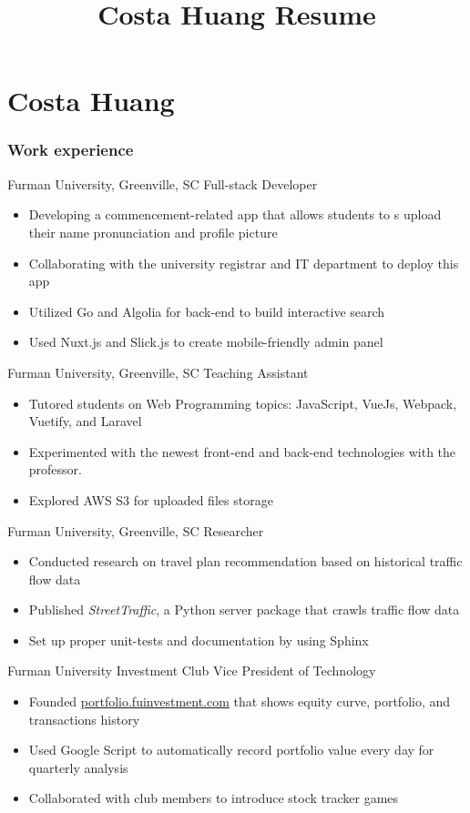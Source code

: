 \documentclass{tccv}
\title{Costa Huang Resume}
\begin{document}
\part{Costa Huang}

\section{Work experience}

\begin{eventlist}

     {Furman University, Greenville, SC}
     {Full-stack Developer}
\begin{itemize}
    \item Developing a commencement-related app that allows students to s 
upload their name pronunciation and profile picture
    \item Collaborating with the university registrar and IT department to deploy this app
    \item Utilized Go and Algolia for back-end to build interactive
search
    \item Used Nuxt.js and Slick.js to create mobile-friendly admin panel
\end{itemize}

     {Furman University, Greenville, SC}
     {Teaching Assistant}
\begin{itemize}
    \item Tutored students on Web Programming topics: JavaScript, VueJs,
Webpack, Vuetify, and Laravel
    \item Experimented with the newest front-end and back-end
technologies with the professor.
    \item Explored AWS S3 for uploaded files storage
\end{itemize}

     {Furman University, Greenville, SC}
     {Researcher}
\begin{itemize}
    \item Conducted research on travel plan recommendation based on
historical traffic flow data
    \item Published \textit{StreetTraffic}, a Python server package that crawls traffic flow data 
    \item Set up proper unit-tests and documentation by using Sphinx
\end{itemize}

     {Furman University Investment Club}
     {Vice President of Technology}
\begin{itemize}
    \item Founded \href{http://portfolio.fuinvestment.com/}{portfolio.fuinvestment.com} that shows equity
curve, portfolio, and transactions history
    \item Used Google Script to automatically record portfolio value every
day for quarterly analysis
    \item Collaborated with club members to introduce stock tracker games
\end{itemize}


\end{eventlist}
\end{document}
